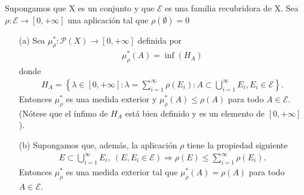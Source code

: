 \begin{teo}
    Supongamos que X es un conjunto y que $\mathcal{E}$ es una familia recubridora de X. Sea $\rho: \mathcal{E} \longrightarrow [0,+\infty]$ una aplicación tal que $\rho(\emptyset) = 0$
    \begin{enumerate}
        \item[(a)] Sea $\mu_{\rho}^*: \mathcal{P}(X) \longrightarrow [0,+\infty]$ definida por
              \begin{align*}
                  \mu_{\rho}^*(A) = \inf(H_A)
              \end{align*}
              donde
              \begin{align*}
                  H_A = \left\{ \lambda \in [0,+\infty] : \lambda = \sum_{i=1}^{\infty}{\rho(E_i)} : A \subset \bigcup_{i=1}^{\infty}{E_i}, E_i \in \mathcal{E} \right\}.
              \end{align*}
              Entonces $\mu_{\rho}^*$ es una medida exterior y $\mu_{\rho}^*(A) \leq \rho(A)$ para todo $A \in \mathcal{E}$. (Nótese que el ínfimo de $H_A$ está bien definido y es un elemento de $[0,+\infty]$).
        \item[(b)] Supongamos que, además, la aplicación $\rho$ tiene la propiedad siguiente
              \begin{align*}
                  E \subset \bigcup_{i=1}^{\infty}{E_i}, \ (E, E_i \in \mathcal{E}) \Longrightarrow \rho(E) \leq \sum_{i=1}^{\infty}{\rho(E_i)}.
              \end{align*}
              Entonces $\mu_{\rho}^*$ es una medida exterior tal que $\mu_{\rho}^*(A) = \rho(A)$ para todo $A \in \mathcal{E}$.
    \end{enumerate}
\end{teo}

